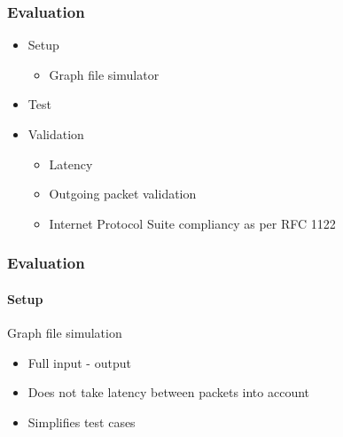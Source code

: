 \newcommand{\EvaluationTitle}{Evaluation}
\begin{frame}
    \frametitle{\EvaluationTitle}
    \centering
    \begin{minipage}{1\textwidth}
        \begin{itemize}%
            \item Setup
            \begin{itemize}
                \item Graph file simulator
            \end{itemize}
            \item Test
            \item Validation
            \begin{itemize}
                \item Latency
                \item Outgoing packet validation
                \item Internet Protocol Suite
                compliancy as per RFC
                1122
            \end{itemize}
        \end{itemize}
    \end{minipage}
\end{frame}

\begin{frame}[fragile]
    \frametitle{\EvaluationTitle}
    \framesubtitle{Setup}
    Graph file simulation\\
    \begin{itemize}%
        \item Full input - output
        \item Does not take latency between packets into account
        \item Simplifies test cases
    \end{itemize}
\end{frame}


